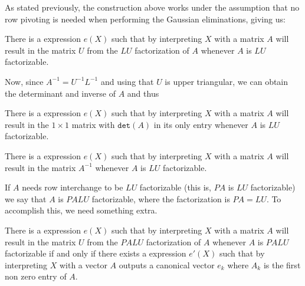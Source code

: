 As stated previously, the construction above works under the assumption that no row pivoting is needed when performing the Gaussian eliminations, giving us:
\begin{proposition}\label{prop:gauss}
There is a \langfor expression $e(X)$ such that by interpreting $X$ with a matrix $A$ will result in the matrix $U$ from the $LU$ factorization of $A$ whenever $A$ is $LU$ factorizable.
\end{proposition}

Now, since $A^{-1}=U^{-1}L^{-1}$ and using that $U$ is upper triangular, we can obtain the determinant and inverse of $A$ and thus




 \begin{proposition}\label{prop:determinant}
There is a \langfor expression $e(X)$ such that by interpreting $X$ with a matrix $A$ will result in the $1\times 1$ matrix with $\texttt{det}(A)$ in its only entry whenever $A$ is $LU$ factorizable.
\end{proposition}

\begin{proposition}\label{prop:inverse}
There is a \langfor expression $e(X)$ such that by interpreting $X$ with a matrix $A$ will result in the matrix $A^{-1}$ whenever $A$ is $LU$ factorizable.
\end{proposition}

If $A$ needs row interchange to be $LU$ factorizable (this is, $PA$ is $LU$ factorizable) we say that $A$ is $PALU$ factorizable, where the factorization is $PA=LU$. To accomplish this, we need something extra.

 \begin{proposition}\label{prop:palu}
There is a \langfor expression $e(X)$ such that by interpreting $X$ with a matrix $A$ will result in the matrix $U$ from the $PALU$ factorization of $A$ whenever $A$ is $PALU$ factorizable if and only if there exists a \langfor expression $e'(X)$ such that by interpreting $X$ with a vector $A$ outputs a canonical vector $e_k$ where $A_k$ is the first non zero entry of $A$.
\end{proposition}

